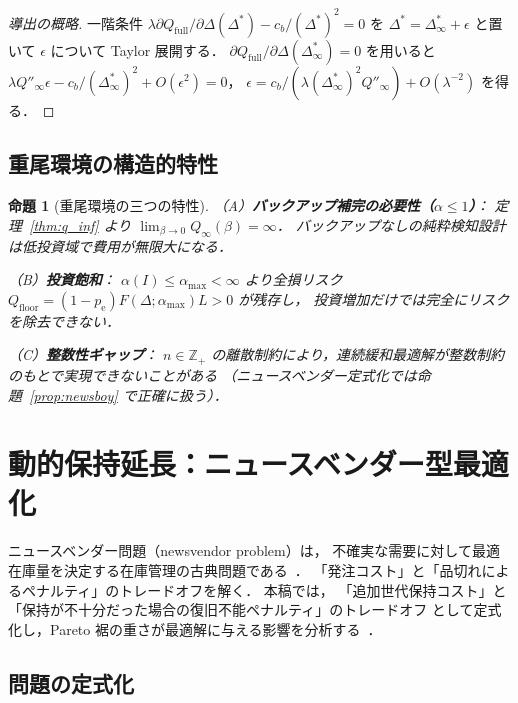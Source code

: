 \documentclass[12pt,a4paper]{article}
\theoremstyle{plain}
\newtheorem{proposition}[theorem]{命題}
\theoremstyle{definition}
\theoremstyle{remark}
\newcommand{\Z}{\mathbb{Z}}
\newcommand{\pe}{p_{\mathrm{e}}}
\newcommand{\Qf}{Q_{\mathrm{full}}}
\newcommand{\Qinf}{Q_{\infty}}
\newcommand{\alphI}{\alpha(I)}
\newcommand{\Dopt}{\Delta^{*}}
\newcommand{\Dinf}{\Delta^{*}_{\infty}}
\begin{document}
\begin{proof}[導出の概略]
一階条件 $\lambda\partial\Qf/\partial\Delta(\Dopt)-c_b/(\Dopt)^2=0$ を
$\Dopt=\Dinf+\epsilon$ と置いて $\epsilon$ について Taylor 展開する．
$\partial\Qf/\partial\Delta(\Dinf)=0$ を用いると
$\lambda Q''_\infty\epsilon-c_b/(\Dinf)^2+O(\epsilon^2)=0$，
$\epsilon=c_b/(\lambda(\Dinf)^2 Q''_\infty)+O(\lambda^{-2})$ を得る．
\end{proof}

\subsection{重尾環境の構造的特性}

\begin{proposition}[重尾環境の三つの特性]\label{prop:structural}
\noindent（A）\textbf{バックアップ補完の必要性（$\alpha\le1$）}：
定理~\ref{thm:q_inf} より $\lim_{\beta\to0}\Qinf(\beta)=\infty$．
バックアップなしの純粋検知設計は低投資域で費用が無限大になる．

\noindent（B）\textbf{投資飽和}：
$\alphI\le\alpha_{\max}<\infty$ より全損リスク $Q_{\mathrm{floor}}=(1-\pe)F(\Delta;\alpha_{\max})L>0$ が残存し，
投資増加だけでは完全にリスクを除去できない．

\noindent（C）\textbf{整数性ギャップ}：
$n\in\Z_+$ の離散制約により，連続緩和最適解が整数制約のもとで実現できないことがある
（ニュースベンダー定式化では命題~\ref{prop:newsboy} で正確に扱う）．
\end{proposition}

\section{動的保持延長：ニュースベンダー型最適化}
\label{sec:newsboy}

\begin{tcolorbox}[mathbox, title={ニュースベンダー問題（Newsvendor Problem）}]
ニュースベンダー問題（newsvendor problem）は，
不確実な需要に対して最適在庫量を決定する在庫管理の古典問題である~\cite{porteus2002,zipkin2000}．
「発注コスト」と「品切れによるペナルティ」のトレードオフを解く．
本稿では，
「追加世代保持コスト」と「保持が不十分だった場合の復旧不能ペナルティ」のトレードオフ
として定式化し，Pareto 裾の重さが最適解に与える影響を分析する~\cite{silver1998}．
\end{tcolorbox}

\subsection{問題の定式化}
\end{document}
